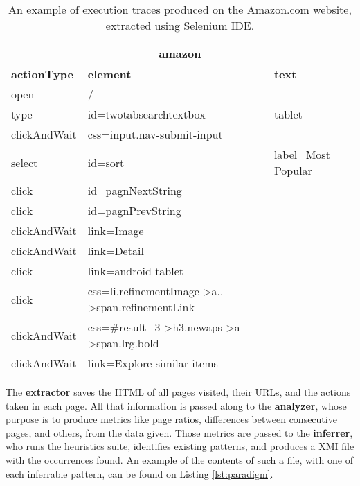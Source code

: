 \begin{table}[!htb]
\begin{tabular}{|l|l|l|}
\hline
\multicolumn{3}{|c|}{\textbf{amazon}} \\ \hline
\textbf{actionType} & \textbf{element} & \textbf{text} \\ \hline
open & / & \\ \hline
type & id=twotabsearchtextbox & tablet \\ \hline
clickAndWait & css=input.nav-submit-input & \\ \hline
select & id=sort & label=Most Popular \\ \hline
click & id=pagnNextString & \\ \hline
click & id=pagnPrevString & \\ \hline
clickAndWait & link=Image & \\ \hline
clickAndWait & link=Detail & \\ \hline
click & link=android tablet & \\ \hline
click & css=li.refinementImage \textgreater a.. \textgreater span.refinementLink & \\ \hline
clickAndWait & css=\#result\_3 \textgreater h3.newaps \textgreater a \textgreater span.lrg.bold & \\ \hline
clickAndWait & link=Explore similar items & \\ \hline
\end{tabular}
\caption[An example of execution traces produced on the Amazon.com website, extracted using Selenium IDE.]{An example of execution traces produced on the Amazon.com website, extracted using Selenium IDE\protect\footnotemark.}
\label{tab:amazontraces}
\end{table}

The \textbf{extractor} saves the HTML of all pages visited, their URLs, and the actions taken in each page. All that information is passed along to the \textbf{analyzer}, whose purpose is to produce metrics like page ratios, differences between consecutive pages, and others, from the data given. Those metrics are passed to the \textbf{inferrer}, who runs the heuristics suite, identifies existing patterns, and produces a XMI file with the occurrences found. An example of the contents of such a file, with one of each inferrable pattern, can be found on Listing \ref{lst:paradigm}.

